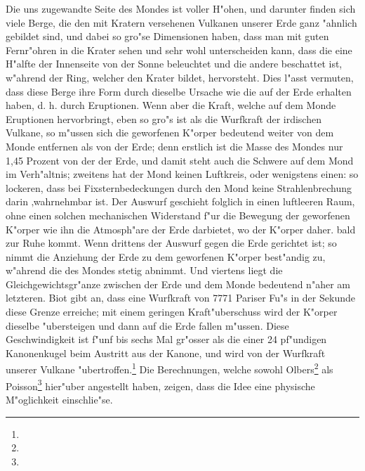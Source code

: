 \documentclass[a4paper, 11pt, oneside]{article}
\begin{document}
Die uns zugewandte Seite des Mondes ist voller H"ohen, und darunter finden sich viele Berge, die den mit Kratern versehenen Vulkanen unserer Erde ganz "ahnlich gebildet sind, und dabei so gro"se Dimensionen haben, dass man mit guten Fernr"ohren in die Krater sehen und sehr wohl unterscheiden kann, dass die eine H"alfte der Innenseite von der Sonne beleuchtet und die andere beschattet ist, w"ahrend der Ring, welcher den Krater bildet, hervorsteht. Dies l"asst vermuten, dass diese Berge ihre Form durch dieselbe Ursache wie die auf der Erde erhalten haben, d. h. durch Eruptionen. Wenn aber die Kraft, welche auf dem Monde Eruptionen hervorbringt, eben so gro"s ist als die Wurfkraft der irdischen Vulkane, so m"ussen sich die geworfenen K"orper bedeutend weiter von dem Monde entfernen als von der Erde; denn erstlich ist die Masse des Mondes nur 1,45 Prozent von der der Erde, und damit steht auch die Schwere auf dem Mond im Verh"altnis; zweitens hat der Mond keinen Luftkreis, oder wenigstens einen: so lockeren, dass bei Fixsternbedeckungen durch den Mond keine Strahlenbrechung darin ‚wahrnehmbar ist. Der Auswurf geschieht folglich in einen luftleeren Raum, ohne einen solchen mechanischen Widerstand f"ur die Bewegung der geworfenen K"orper wie ihn die Atmosph"are der Erde darbietet, wo der K"orper daher. bald zur Ruhe kommt. Wenn drittens der Auswurf gegen die Erde gerichtet ist; so nimmt die Anziehung der Erde zu dem geworfenen K"orper best"andig zu, w"ahrend die des Mondes stetig abnimmt. Und viertens liegt die Gleichgewichtsgr"anze zwischen der Erde und dem Monde bedeutend n"aher am letzteren. Biot gibt an, dass eine Wurfkraft von 7771 Pariser Fu"s in der Sekunde diese Grenze erreiche; mit einem geringen Kraft"uberschuss wird der K"orper dieselbe "ubersteigen und dann auf die Erde fallen m"ussen. Diese Geschwindigkeit ist f"unf bis sechs Mal gr"osser als die einer 24 pf"undigen Kanonenkugel beim Austritt aus der Kanone, und wird von der Wurfkraft unserer Vulkane "ubertroffen.\footnote{} Die Berechnungen, welche sowohl Olbers\footnote{} als Poisson\footnote{} hier"uber angestellt haben, zeigen, dass die Idee eine physische M"oglichkeit einschlie"se.
\end{document}
